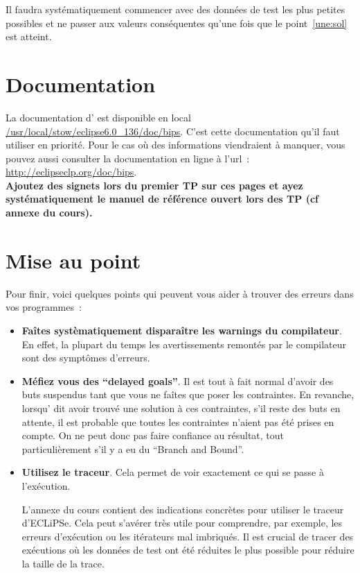 Il faudra systématiquement commencer avec des données de test les plus
petites possibles et ne passer aux valeurs conséquentes qu'une fois
que le point~\ref{une:sol} est atteint.

\section*{Documentation}
La documentation d'\eclipse{} est disponible en local
\url{/usr/local/stow/eclipse6.0\_136/doc/bips}. C'est cette
documentation qu'il faut utiliser en priorité. Pour le cas où des
informations viendraient à manquer, vous pouvez aussi consulter la
documentation en ligne à l'url~: \url{http://eclipseclp.org/doc/bips}.\\

{\bf Ajoutez des signets lors du premier TP sur ces pages et ayez
systématiquement le manuel de référence ouvert lors des TP (cf annexe
du cours).}


\section*{Mise au point}

Pour finir, voici quelques points qui peuvent vous aider à trouver des
erreurs dans vos programmes~:

\begin{itemize}
\item {\bf Faîtes systèmatiquement disparaître les warnings du
    compilateur}. En effet, la plupart du temps les avertissements
  remontés par le compilateur sont des symptômes d'erreurs.\\  


\item {\bf Méfiez vous des ``delayed goals''}. Il est tout à fait
  normal d'avoir des buts suspendus tant que vous ne faîtes que poser
  les contraintes.  En revanche, lorsqu'\eclipse{} dit avoir trouvé
  une solution à ces contraintes, s'il reste des buts en attente, il
  est probable que toutes les contraintes n'aient pas été prises en
  compte. On ne peut donc pas faire confiance au résultat, tout
  particulièrement s'il y a eu du ``Branch and Bound''.\\

\item {\bf Utilisez le traceur}. Cela permet de voir exactement ce qui
  se passe à l'exécution.

  L'annexe du cours contient des indications concrètes pour utiliser
  le traceur d'ECLiPSe. Cela peut s'avérer très utile pour comprendre,
  par exemple, les erreurs d'exécution ou les itérateurs mal
  imbriqués.  Il est crucial de tracer des exécutions où les données
  de test ont été réduites le plus possible pour réduire la taille de
  la trace.

\end{itemize}
